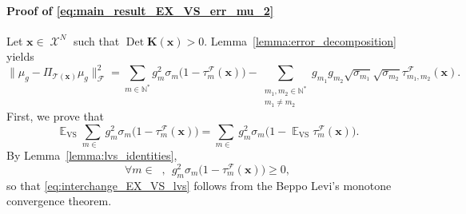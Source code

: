 \documentclass[twoside,11pt]{book}
\DeclareMathOperator{\Det}{Det}
\DeclareMathOperator{\VS}{\mathrm{VS}}
\DeclareMathOperator{\EX}{\mathbb{E}}
\DeclareMathOperator{\F}{\mathcal{F}}
\DeclareMathOperator{\X}{\mathcal{X}}
\DeclareMathOperator{\Ns}{\mathbb{N}^{*}}
\newcommand{\rb}[1]{\textcolor{magenta}{#1}}
\begin{document}
\paragraph{Proof of \eqref{eq:main_result_EX_VS_err_mu_2}}
Let $\bm{x} \in \X^{N}$ such that $\Det \bm{K}(\bm{x}) >0 $. Lemma~\ref{lemma:error_decomposition} yields
\begin{equation}
\|\mu_{g} - \Pi_{\mathcal{T}(\bm{x})} \mu_{g}\|_{\F}^{2}  = \sum\limits_{m \in \mathbb{N}^{*}} g_{m}^{2} \sigma_{m}\bigg(1- \tau_{m}^{\F}(\bm{x})\bigg) - \sum\limits_{\substack{m_{1},m_{2} \in \mathbb{N}^{*} \\ m_{1} \neq m_{2}}}  g_{m_{1}}g_{m_{2}} \sqrt{\sigma_{m_{1}}} \sqrt{\sigma_{m_{2}}} \tau_{m_{1},m_{2}}^{\F}(\bm{x}).
\end{equation}
First, we prove that
\begin{equation}\label{eq:interchange_EX_VS_lvs}
\EX_{\VS} \sum\limits_{m \in \Ns} g_{m}^{2} \sigma_{m}\bigg(1- \tau_{m}^{\F}(\bm{x})\bigg) = \sum\limits_{m \in \Ns} g_{m}^{2} \sigma_{m}\bigg(1- \EX_{\VS}\tau_{m}^{\F}(\bm{x})\bigg).
\end{equation}
By Lemma~\ref{lemma:lvs_identities},
\begin{equation}
\forall m \in \Ns, \:\: g_{m}^{2} \sigma_{m}\bigg(1- \tau_{m}^{\F}(\bm{x})\bigg)\geq 0, \label{e:summable_term}
\end{equation}
so that \eqref{eq:interchange_EX_VS_lvs} follows from the Beppo Levi's monotone convergence theorem.
\end{document}
